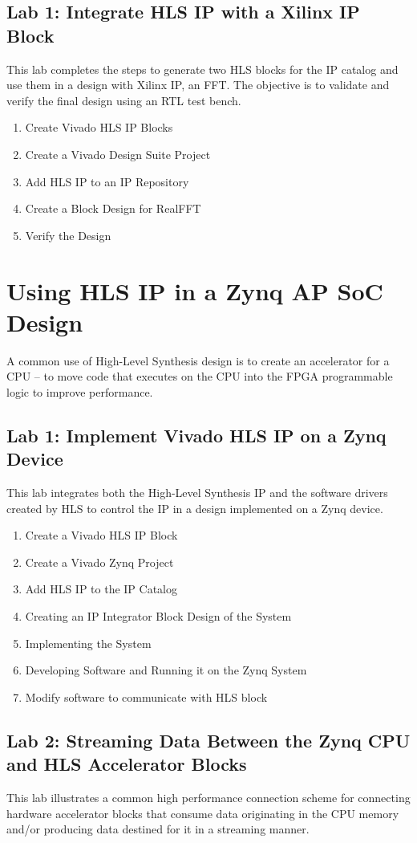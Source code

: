 \subsection{Lab 1: Integrate HLS IP with a Xilinx IP Block}
This lab completes the steps to generate two HLS blocks for the IP catalog and use them in a design with Xilinx IP, an FFT. The objective is to validate and verify the final design using an RTL test bench.

\begin{enumerate}[label=Step \arabic*:]
    \item Create Vivado HLS IP Blocks
    \item Create a Vivado Design Suite Project
    \item Add HLS IP to an IP Repository
    \item Create a Block Design for RealFFT
    \item Verify the Design
\end{enumerate}



\section{Using HLS IP in a Zynq AP SoC Design}
A common use of High-Level Synthesis design is to create an accelerator for a CPU – to move code that executes on the CPU into the FPGA programmable logic to improve performance. 

\subsection{Lab 1: Implement Vivado HLS IP on a Zynq Device}
This lab integrates both the High-Level Synthesis IP and the software drivers created by HLS to control the IP in a design implemented on a Zynq device.

\begin{enumerate}[label=Step \arabic*:]
    \item Create a Vivado HLS IP Block
    \item Create a Vivado Zynq Project
    \item Add HLS IP to the IP Catalog
    \item Creating an IP Integrator Block Design of the System
    \item Implementing the System
    \item Developing Software and Running it on the Zynq System
    \item Modify software to communicate with HLS block
\end{enumerate}

\subsection{Lab 2: Streaming Data Between the Zynq CPU and HLS Accelerator Blocks}
This lab illustrates a common high performance connection scheme for connecting hardware accelerator blocks that consume data originating in the CPU memory and/or producing data destined for it in a streaming manner. 